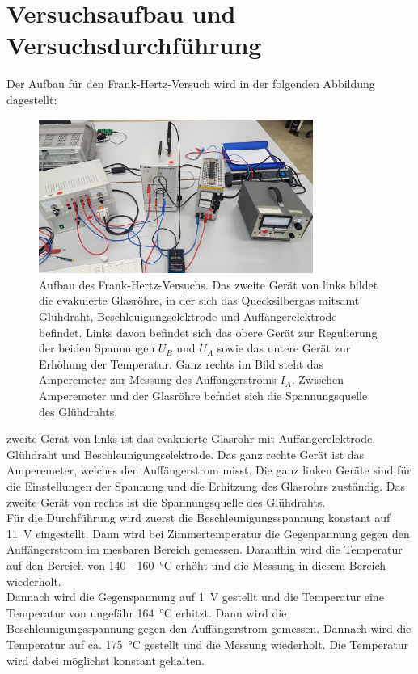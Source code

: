 \section{Versuchsaufbau und Versuchsdurchführung}\justifying
Der Aufbau für den Frank-Hertz-Versuch wird in der folgenden Abbildung dagestellt:
\begin{figure}[H]
    \centering
    \includegraphics[width=0.8\textwidth]{images/Aufbau.jpg}
    \caption{
        Aufbau des Frank-Hertz-Versuchs.
        Das zweite Gerät von links bildet die evakuierte Glasröhre, in der sich
        das Quecksilbergas mitsamt Glühdraht, Beschleuigungselektrode und Auffängerelektrode
        befindet. Links davon befindet sich das obere Gerät zur Regulierung der beiden Spannungen
        $U_B$ und $U_A$ sowie das untere Gerät zur Erhöhung der Temperatur. Ganz rechts im Bild steht
        das Amperemeter zur Messung des Auffängerstroms $I_A$. Zwischen Amperemeter und
        der Glasröhre befndet sich die Spannungsquelle des Glühdrahts.
    } 
    \label{fig:4}
\end{figure}
 zweite Gerät von links ist das evakuierte Glasrohr mit Auffängerelektrode, Glühdraht und
Beschleunigungselektrode. Das ganz rechte Gerät ist das Amperemeter, welches den
Auffängerstrom misst. Die ganz linken Geräte sind für die Einstellungen der Spannung und 
die Erhitzung des Glasrohrs zuständig. Das zweite Gerät von rechts ist die Spannungsquelle
des Glühdrahts.\\
Für die Durchführung wird zuerst die Beschleunigungsspannung konstant auf \SI{11}{\volt} eingestellt.
Dann wird bei Zimmertemperatur die Gegenpannung gegen den Auffängerstrom im mesbaren Bereich gemessen.
Daraufhin wird die Temperatur auf den Bereich von 140 - \SI{160}{\celsius} erhöht und die Messung in diesem Bereich wiederholt.\\
Dannach wird die Gegenspannung auf \SI{1}{\volt} gestellt und die Temperatur eine Temperatur von
ungefähr \SI{164}{\celsius} erhitzt. Dann wird die Beschleunigungsspannung gegen
den Auffängerstrom gemessen. Dannach wird die Temperatur auf ca. \SI{175}{\celsius} gestellt 
und die Messung wiederholt. Die Temperatur wird dabei möglichst konstant gehalten.


